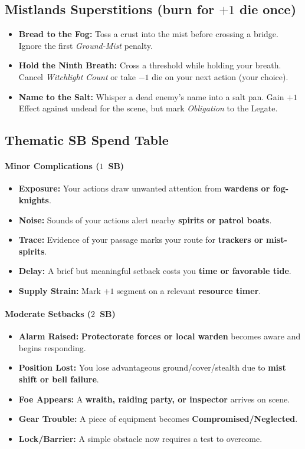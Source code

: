\subsection*{Mistlands Superstitions (burn for $+1$ die once)}
\begin{itemize}
  \item \textbf{Bread to the Fog:} Toss a crust into the mist before crossing a bridge. Ignore the first \emph{Ground-Mist} penalty. 
  \item \textbf{Hold the Ninth Breath:} Cross a threshold while holding your breath. Cancel \emph{Witchlight Count} or take $-1$ die on your next action (your choice). 
  \item \textbf{Name to the Salt:} Whisper a dead enemy's name into a salt pan. Gain $+1$ Effect against undead for the scene, but mark \emph{Obligation} to the Legate. 
\end{itemize}

\subsection*{Thematic SB Spend Table}
\label{sec:mistlands-sb}

\paragraph{Minor Complications ($1$~SB)}
\begin{itemize}
\item \textbf{Exposure:} Your actions draw unwanted attention from \textbf{wardens or fog-knights}.
\item \textbf{Noise:} Sounds of your actions alert nearby \textbf{spirits or patrol boats}.
\item \textbf{Trace:} Evidence of your passage marks your route for \textbf{trackers or mist-spirits}.
\item \textbf{Delay:} A brief but meaningful setback costs you \textbf{time or favorable tide}.
\item \textbf{Supply Strain:} Mark $+1$ segment on a relevant \textbf{resource timer}.
\end{itemize}

\paragraph{Moderate Setbacks ($2$~SB)}
\begin{itemize}
\item \textbf{Alarm Raised:} \textbf{Protectorate forces or local warden} becomes aware and begins responding.
\item \textbf{Position Lost:} You lose advantageous ground/cover/stealth due to \textbf{mist shift or bell failure}.
\item \textbf{Foe Appears:} A \textbf{wraith, raiding party, or inspector} arrives on scene.
\item \textbf{Gear Trouble:} A piece of equipment becomes \textbf{Compromised/Neglected}.
\item \textbf{Lock/Barrier:} A simple obstacle now requires a test to overcome.
\end{itemize}

